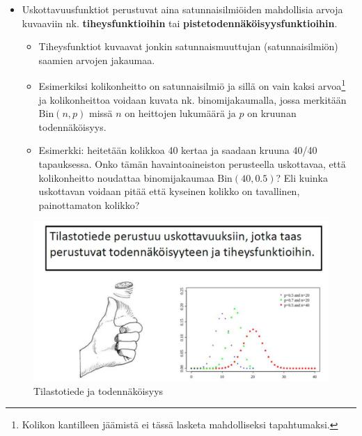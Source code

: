 \documentclass[
]{book}
\providecommand{\tightlist}{%
  \setlength{\itemsep}{0pt}\setlength{\parskip}{0pt}}
\begin{document}
\begin{itemize}
\tightlist
\item
  Uskottavuusfunktiot perustuvat aina satunnaisilmiöiden mahdollisia arvoja kuvaaviin nk. \textbf{tiheysfunktioihin} tai \textbf{pistetodennäköisyysfunktioihin}.

  \begin{itemize}
  \tightlist
  \item
    Tiheysfunktiot kuvaavat jonkin satunnaismuuttujan (satunnaisilmiön) saamien arvojen jakaumaa.
  \item
    Esimerkiksi kolikonheitto on satunnaisilmiö ja sillä on vain kaksi arvoa\footnote{Kolikon kantilleen jäämistä ei tässä lasketa mahdolliseksi tapahtumaksi.} ja kolikonheittoa voidaan kuvata nk. binomijakaumalla, jossa merkitään \(\text{Bin}(n,p)\) missä \(n\) on heittojen lukumäärä ja \(p\) on kruunan todennäköisyys.
  \item
    Esimerkki: heitetään kolikkoa 40 kertaa ja saadaan kruuna 40/40 tapauksessa. Onko tämän havaintoaineiston perusteella uskottavaa, että kolikonheitto noudattaa binomijakaumaa \(\text{Bin}(40, 0.5)\)? Eli kuinka uskottavan voidaan pitää että kyseinen kolikko on tavallinen, painottamaton kolikko?
  \end{itemize}
\end{itemize}

\begin{figure}

{\centering \includegraphics[width=1\linewidth]{images/perustuu} 

}

\caption{Tilastotiede ja todennäköisyys}\label{fig:perus}
\end{figure}

\hfill\break
\hfill\break
\end{document}
